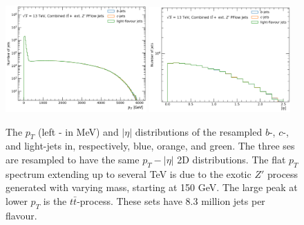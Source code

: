 \begin{figure}[h!]
  \center
  \includegraphics[width=0.48\textwidth]{Images/FTAG/DL1d/ptdist.png}
  \includegraphics[width=0.48\textwidth]{Images/FTAG/DL1d/etadist.png}
  \caption{The $p_T$ (left - in MeV) and $|\eta|$ distributions of the resampled $b$-, $c$-, and light-jets in, respectively, blue, orange, and green. The three ses are resampled to have the same $p_T-|\eta|$ 2D distributions. The flat $p_T$ spectrum extending up to several TeV is due to the exotic $Z'$ process generated with varying mass, starting at 150 GeV. The large peak at lower $p_T$ is the $t\bar{t}$-process. These sets have 8.3 million jets per flavour.} 
  \label{fig:distTraining}
\end{figure}

